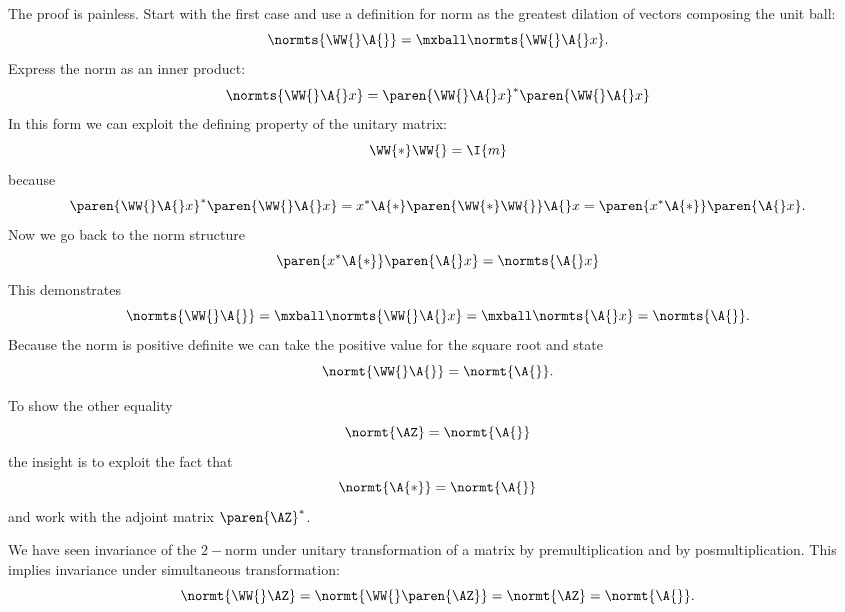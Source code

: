 The proof is painless. Start with the first case and use a definition for norm as the greatest dilation of vectors composing the unit ball:
\begin{equation}
  \normts{ \WW{} \A{} } = \mxball \normts{ \WW{} \A{} x }.
\end{equation}
Express the norm as an inner product:
\begin{equation}
  \normts{ \WW{} \A{} x } 
    = \paren{\WW{} \A{} x}^{*} \paren{\WW{} \A{} x} 
\end{equation}
In this form we can exploit the defining property of the unitary matrix:
\begin{equation}
  \WW{*}\WW{} = \I{m}
\end{equation}
because
\begin{equation}
  \paren{\WW{} \A{} x}^{*} \paren{\WW{} \A{} x} 
    = x^{*}\A{*}\paren{\WW{*}\WW{}} \A{}x
    = \paren{x^{*}\A{*}}  \paren{\A{}x}.
\end{equation}
Now we go back to the norm structure
\begin{equation}
  \paren{x^{*}\A{*}}  \paren{\A{}x} = \normts{ \A{} x }
\end{equation}
This demonstrates
\begin{equation}
  \normts{ \WW{} \A{} } 
    = \mxball \normts{ \WW{} \A{} x }
    = \mxball \normts{ \A{} x } 
    = \normts{ \A{} } .
\end{equation}
Because the norm is positive definite we can take the positive value for the square root and state
\begin{equation}
  \normt{ \WW{} \A{} } = \normt{ \A{} }.
\end{equation}

To show the other equality
\begin{equation}
  \normt{ \AZ } = \normt{ \A{} }
\end{equation}
the insight is to exploit the fact that
\begin{equation}
  \normt{ \A{*} } = \normt{ \A{} }
\end{equation}
and work with the adjoint matrix $\paren{\AZ}^{*} $.

We have seen invariance of the $2-$norm under unitary transformation of a matrix by premultiplication and by posmultiplication. This implies invariance under simultaneous transformation:
\begin{equation}
  \normt{ \WW{} \AZ } = \normt{ \WW{} \paren{\AZ}  } = \normt{ \AZ } = \normt{ \A{} }.
\end{equation}


